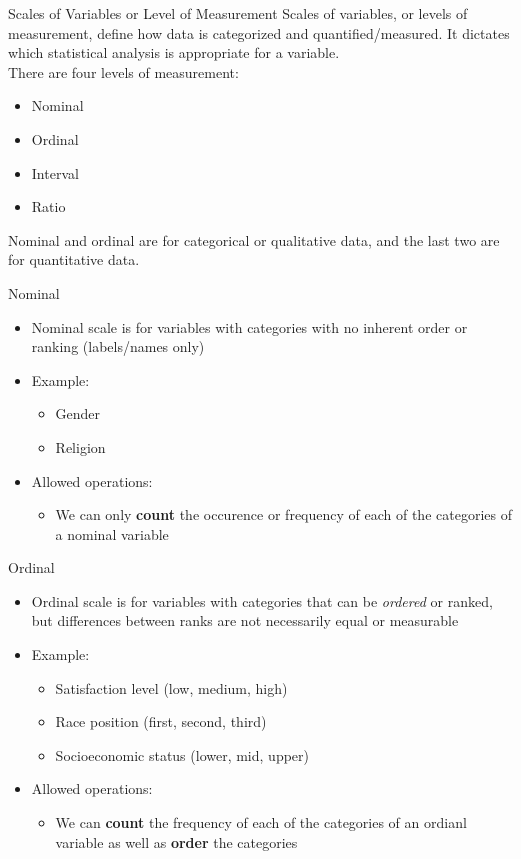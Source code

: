 \documentclass[12pt, aspectratio=169]{beamer}
\begin{document}
	\begin{frame}{Scales of Variables or Level of Measurement}
		Scales of variables, or levels of measurement, define how data is categorized and quantified/measured. It dictates which statistical analysis is appropriate for a variable.\\[1em]
		There are four levels of measurement:
		\begin{itemize}
			\item Nominal
			\item Ordinal
			\item Interval
			\item Ratio
		\end{itemize}
		\vspace{1em}
		Nominal and ordinal are for categorical or qualitative data, and the last two are for quantitative data.
	\end{frame}


	\begin{frame}{Nominal}
		\begin{itemize}
			\item Nominal scale is for variables with categories with no inherent order or ranking (labels/names only)
			\item Example:
			\begin{itemize}
				\item Gender
				\item Religion
			\end{itemize}
			\item Allowed operations:
			\begin{itemize}
				\item We can only \textbf{count} the occurence or frequency of each of the categories of a nominal variable
			\end{itemize}
		\end{itemize}
	\end{frame}


	\begin{frame}{Ordinal}
		\begin{itemize}
			\item Ordinal scale is for variables with categories that can be \textit{ordered} or ranked, but differences between ranks are not necessarily equal or measurable
			\item Example:
			\begin{itemize}
				\item Satisfaction level (low, medium, high)
				\item Race position (first, second, third)
				\item Socioeconomic status (lower, mid, upper)
			\end{itemize}
			\item Allowed operations:
			\begin{itemize}
				\item We can \textbf{count} the frequency of each of the categories of an ordianl variable as well as \textbf{order} the categories
			\end{itemize}
		\end{itemize}
	\end{frame}
\end{document}
